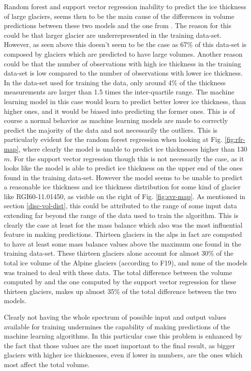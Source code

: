 Random forest and support vector regression inability to predict the ice thickness of large glaciers, seems then to be the main cause of the differences in volume predictions between these two models and the one from \citet{Farinotti2019}.
The reason for this could be that larger glacier are underrepresented in the training data-set. However, as seen above this doesn't seem to be the case as 67\% of this data-set is composed by glaciers which are predicted to have large volumes.
Another reason could be that the number of observations with high ice thickness in the training data-set is low compared to the number of observations with lower ice thickness. In the data-set used for training the data, only around 4\% of the thickness measurements are larger than 1.5 times the inter-quartile range. The machine learning model in this case would learn to predict better lower ice thickness, than higher ones, and it would be biased into predicting the former ones. This is of course a normal behavior as machine learning models are made to correctly predict the majority of the data and not necessarily the outliers. This is particularly evident for the random forest regression when looking at Fig. \ref{fig:rfr-map}, where clearly the model is unable to predict ice thicknesses higher than 130$m$.
For the support vector regression though this is not necessarily the case, as it looks like the model is able to predict ice thickness on the upper end of the ones found in the training data-set. However the model seems to be unable to predict a reasonable ice thickness and ice thickness distribution for some kind of glacier like RGI60-11.01450, as visible on the right of Fig. \ref{fig:svr-map}. As mentioned in section \ref{disc-vol-dist}, this could be attributed to the range of some input data extending far beyond the range of the data used to train the algorithm. This is clearly the case at least for the mass balance which also was the most influential feature in making predictions. Thirteen glaciers in the alps in fact are computed to have at least some mass balance values above the maximum one found in the training data-set. These thirteen glaciers alone account for almost 30\% of the total ice volume of the Alpine glaciers (according to F19), and none of the models was trained to deal with these data. The total difference between the volume computed by \citet{Farinotti2019} and the one computed by the support vector regression for these thirteen glaciers, makes up almost 35\% of the total difference between the two models.
 
Clearly not having the whole spectrum of possible input and output values available for training undermines the capability of making predictions of the machine learning algorithms. In this particular case this problem is enhanced by the fact that those values are the most important to the final result, as bigger glaciers with higher ice thicknesses, even if lower in numbers, are the ones which most affect the total volume. 



